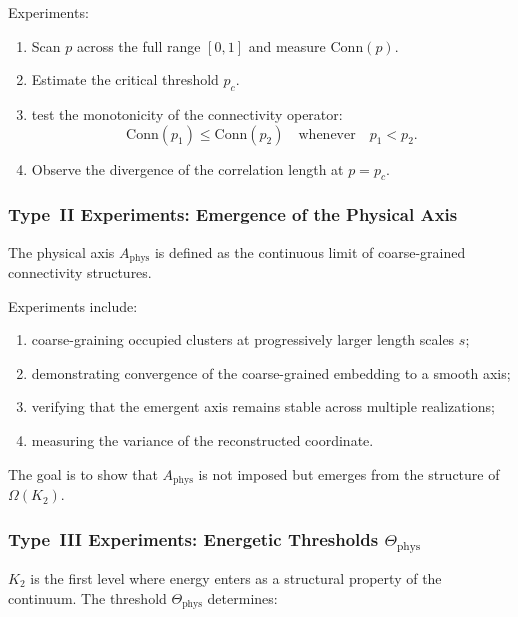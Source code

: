 Experiments:

\begin{enumerate}
    \item Scan $p$ across the full range $[0,1]$ and measure $\mathrm{Conn}(p)$.
    \item Estimate the critical threshold $p_c$.
    \item test the monotonicity of the connectivity operator:
          \[
             \mathrm{Conn}(p_1) \le \mathrm{Conn}(p_2)
             \quad \text{whenever} \quad p_1 < p_2.
          \]
    \item Observe the divergence of the correlation length at $p = p_c$.
\end{enumerate}



\subsubsection{Type~II Experiments: Emergence of the Physical Axis}

The physical axis $A_{\mathrm{phys}}$ is defined as the continuous limit of
coarse-grained connectivity structures.

Experiments include:

\begin{enumerate}
    \item coarse-graining occupied clusters at progressively larger length
          scales $s$;
    \item demonstrating convergence of the coarse-grained embedding to a
          smooth axis;
    \item verifying that the emergent axis remains stable across multiple
          realizations;
    \item measuring the variance of the reconstructed coordinate.
\end{enumerate}

The goal is to show that $A_{\mathrm{phys}}$ is not imposed but emerges
from the structure of $\Omega(K_2)$.



\subsubsection{Type~III Experiments: Energetic Thresholds $\Theta_{\mathrm{phys}}$}

$K_2$ is the first level where energy enters as a structural property of the
continuum.
The threshold $\Theta_{\mathrm{phys}}$ determines:

